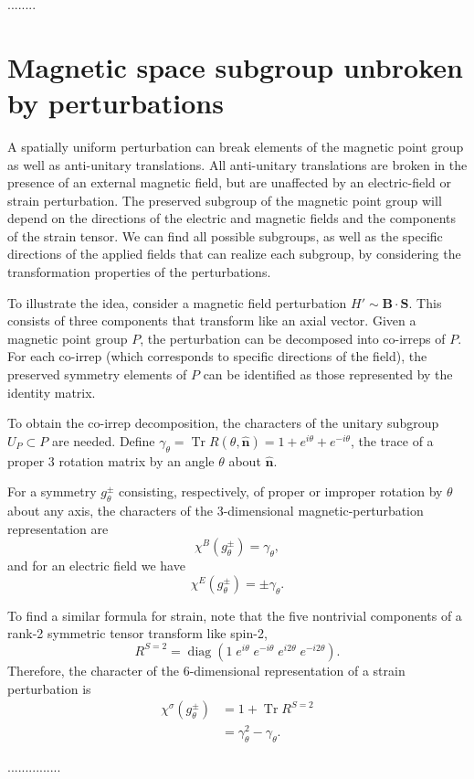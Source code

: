 \documentclass[12pt, a4paper]{article}
\DeclareMathOperator{\Tr}{Tr}
\DeclareMathOperator{\diag}{diag}
\begin{document}
........




\section{Magnetic space subgroup unbroken by perturbations}
A spatially uniform perturbation can break elements of the magnetic point group as well as anti-unitary translations. All anti-unitary translations are broken in the presence of an external magnetic field, but are unaffected by an electric-field or strain perturbation. The preserved subgroup of the magnetic point group will depend on the directions of the electric and magnetic fields and the components of the strain tensor. We can find all possible subgroups, as well as the specific directions of the applied fields that can realize each subgroup, by considering the transformation properties of the perturbations.

To illustrate the idea, consider a magnetic field perturbation $H'\sim\bm{B}\cdot\bm{S}$. This consists of three components that transform like an axial vector. Given a magnetic point group $P$, the perturbation can be decomposed into co-irreps of $P$. For each co-irrep (which corresponds to specific directions of the field), the preserved symmetry elements of $P$ can be identified as those represented by the identity matrix.

To obtain the co-irrep decomposition, the characters of the unitary subgroup $U_{P}\subset P$ are needed. Define $\gamma_{\theta}=\Tr R(\theta, \hat{\bm{n}})=1+e^{i\theta}+e^{-i\theta}$, the trace of a proper 3 rotation matrix by an angle $\theta$ about $\hat{\bm{n}}$.

For a symmetry $g_{\theta}^{\pm}$ consisting, respectively, of proper or improper rotation by $\theta$ about any axis, the characters of the 3-dimensional magnetic-perturbation representation are
\begin{equation}
  \chi^B(g^{\pm}_{\theta})=\gamma_{\theta},
\end{equation}
and for an electric field we have
\begin{equation}
  \chi^E(g^{\pm}_{\theta})=\pm\gamma_{\theta}.
\end{equation}

To find a similar formula for strain, note that the five nontrivial components of a rank-2 symmetric tensor transform like spin-2,
\begin{equation}
  R^{S=2}=\diag(1\;e^{i\theta}\;e^{-i\theta}\;e^{i2\theta}\;e^{-i2\theta}).
\end{equation}
Therefore, the character of the 6-dimensional representation of a strain perturbation is 
\begin{align}
  \chi^{\sigma}(g^{\pm}_{\theta}) &= 1+\Tr R^{S=2} \\
   &= \gamma_{\theta}^2-\gamma_{\theta}.
\end{align}

\newcommand{\ndtwonio}{Nd\textsubscript{2}NiO\textsubscript{4.11}}

...............

{}

\end{document}
